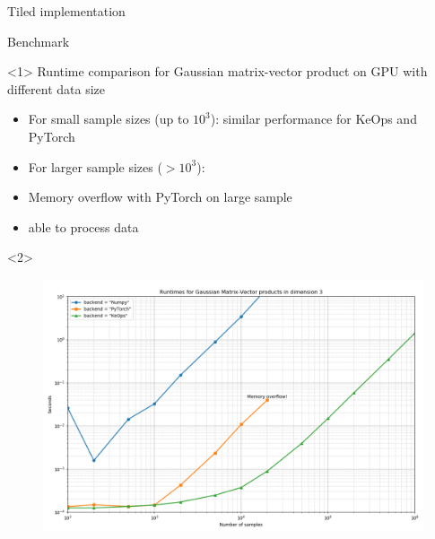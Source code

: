 \documentclass[14pt]{beamer}
\begin{document}
\begin{frame}{Tiled implementation}

\end{frame}




\begin{frame}{Benchmark}

\hypertarget{benchmark}{}

\begin{onlyenv}<1>
Runtime comparison for Gaussian matrix-vector product on GPU with different data size\bigskip

\begin{itemize}
\small
\setitsep{1em}
\item For small sample sizes (up to $10^3$): similar performance for KeOps and PyTorch
\item For larger sample sizes ($>10^3$): 
\item Memory overflow with PyTorch on large sample
\item {} able to process data 
\end{itemize}
\btVFill

\hyperlink{implementation}{}
\end{onlyenv}

\begin{onlyenv}<2>
\begin{figure}
\centering
\includegraphics[width=\linewidth]{./images/benchmark.png}
\end{figure}
\end{onlyenv}
\end{frame}
\end{document}
